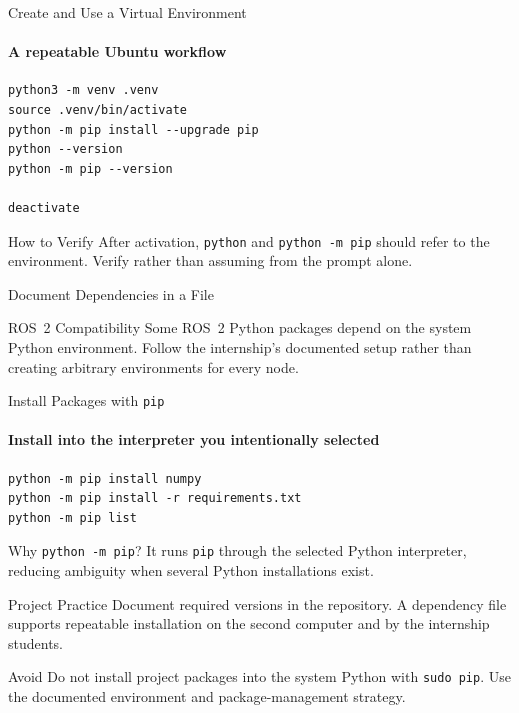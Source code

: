 \begin{frame}[fragile]{Create and Use a Virtual Environment}
\framesubtitle{A repeatable Ubuntu workflow}
\begin{verbatim}
python3 -m venv .venv
source .venv/bin/activate
python -m pip install --upgrade pip
python --version
python -m pip --version

deactivate
\end{verbatim}
\begin{block}{How to Verify}
After activation, \texttt{python} and \texttt{python -m pip} should refer to the environment. Verify rather than assuming from the prompt alone.
\end{block}

\end{frame}



\begin{frame}[fragile]{Document Dependencies in a File}
\begin{alertblock}{ROS~2 Compatibility}
Some ROS~2 Python packages depend on the system Python environment. Follow the internship's documented setup rather than creating arbitrary environments for every node.
\end{alertblock}
\end{frame}

\begin{frame}[fragile]{Install Packages with \texttt{pip}}
\framesubtitle{Install into the interpreter you intentionally selected}

\footnotesize
\begin{verbatim}
python -m pip install numpy
python -m pip install -r requirements.txt
python -m pip list
\end{verbatim}
\begin{block}{Why \texttt{python -m pip}?}
It runs \texttt{pip} through the selected Python interpreter, reducing ambiguity when several Python installations exist.
\end{block}
\begin{exampleblock}{Project Practice}
Document required versions in the repository. A dependency file supports repeatable installation on the second computer and by the internship students.
\end{exampleblock}
\begin{alertblock}{Avoid}
Do not install project packages into the system Python with \texttt{sudo pip}. Use the documented environment and package-management strategy.
\end{alertblock}
\end{frame}

